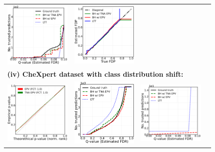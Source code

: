 \documentclass{article}
\begin{document}
\begin{figure}[h!]
\begin{tabular}{cccc}
		\includegraphics[width=1.7in]{img/cnn_chx_fdr_control_loc.png} & 
		\includegraphics[width=1.7in]{img/cnn_FDPscat_chx.png}\\
		\multicolumn{4}{l}{\bf (iv) CheXpert dataset with class distribution shift:}\\	
		\includegraphics[width=1.7in]{img/cnn_QQ_chx_balanced.png} 		&
		\includegraphics[width=1.7in]{img/cnn_chx_balanced_fdr_control.png} & 
		\includegraphics[width=1.7in]{img/cnn_chx_balanced_fdr_control_loc.png} & 

\end{tabular}
\end{figure}
\end{document}
